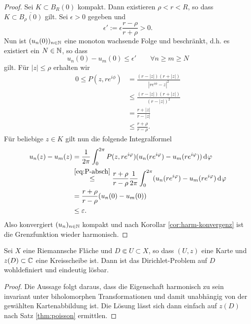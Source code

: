 \begin{proof}
  Sei $K \subset B_R(0)$ kompakt. Dann existieren $\rho < r < R$, so
  dass $K \subset \overline{B_\rho(0)}$ gilt. Sei $\epsilon > 0$ gegeben und
  \[
  \epsilon' := \epsilon \frac{r - \rho}{ r+ \rho} > 0.
  \]
  Nun ist $(u_n(0))_{n \in \mathbb{N}}$ eine monoton wachsende Folge und
  beschränkt, d.h. es existiert ein $N \in \mathbb{N}$, so dass
  \[
  u_n(0) - u_m(0) \leq \epsilon' \qquad \forall n \geq m \geq N
  \]
  gilt. Für $|z| \leq \rho$ erhalten wir
  \begin{align}
    0 \leq P(z, re^{i\phi}) & = \frac{(r - |z|)(r+|z|)}{|re^{i\phi} -
      z|^2} \nonumber\\
    & \leq \frac{(r- |z|)(r + |z|)}{(r - |z|)^2} \nonumber\\
    & = \frac{r + |z|}{r - |z|} \nonumber\\
    & \leq \frac{ r + \rho}{ r - \rho}. \label{eq:P-absch} 
  \end{align}
  Für beliebige $z \in K$ gilt nun die folgende Integralformel
  \begin{align*}
    u_n(z) - u_m(z) & = \frac{1}{2\pi} \int_0^{2\pi} P(z, re^{i\phi})
    (u_n(re^{i\phi}) - u_m(re^{i\phi})) \d[\phi] \\
    & \stackrel{\eqref{eq:P-absch}}{\leq} \frac{r + \rho}{r - \rho}
    \frac{1}{2\pi} \int_0^{2\pi} (u_n(r e^{i\phi}) -  u_m(re^{i\phi})
    \d[\phi] \\
    & = \frac{r+\rho}{r - \rho} (u_n(0) - u_m(0)) \\
    & \leq \epsilon.
  \end{align*}
  Also konvergiert $(u_n)_{n \in \mathbb{N}}$ kompakt und nach Korollar
  \ref{cor:harm-konvergenz} ist die Grenzfunktion wieder harmonisch.
\end{proof}

\begin{prop}
  \label{prop:harm-rf}
  Sei $X$ eine Riemannsche Fläche und $D \Subset U \subset X$, so dass
  $(U, z)$ eine Karte und $z(D) \subset \mathbb{C}$ eine Kreisscheibe
  ist. Dann ist das Dirichlet-Problem auf $D$ wohldefiniert und
  eindeutig lösbar.
\end{prop}

\begin{proof}
  Die Aussage folgt daraus, dass die Eigenschaft harmonisch zu sein
  invariant unter biholomorphen Transformationen und damit unabhängig
  von der gewählten Kartenabbildung ist. Die Lösung lässt sich dann
  einfach auf $z(D)$ nach Satz \ref{thm:poisson} ermittlen.
\end{proof}

